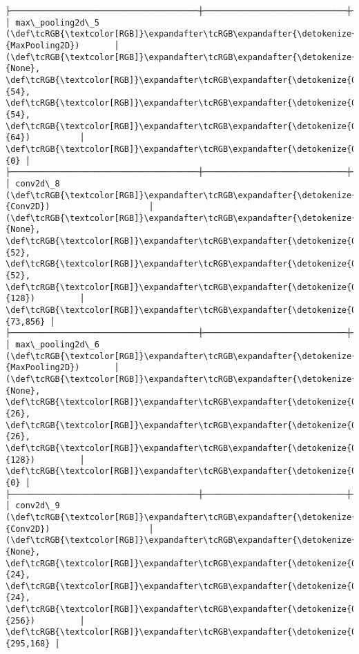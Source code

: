 \documentclass[11pt]{article}
\begin{document}
\begin{Verbatim}[commandchars=\\\{\}]
├──────────────────────────────────────┼─────────────────────────────┼─────────────────┤
│ max\_pooling2d\_5 (\def\tcRGB{\textcolor[RGB]}\expandafter\tcRGB\expandafter{\detokenize{0,135,255}}{MaxPooling2D})       │ (\def\tcRGB{\textcolor[RGB]}\expandafter\tcRGB\expandafter{\detokenize{0,215,255}}{None}, \def\tcRGB{\textcolor[RGB]}\expandafter\tcRGB\expandafter{\detokenize{0,175,0}}{54}, \def\tcRGB{\textcolor[RGB]}\expandafter\tcRGB\expandafter{\detokenize{0,175,0}}{54}, \def\tcRGB{\textcolor[RGB]}\expandafter\tcRGB\expandafter{\detokenize{0,175,0}}{64})          │               \def\tcRGB{\textcolor[RGB]}\expandafter\tcRGB\expandafter{\detokenize{0,175,0}}{0} │
├──────────────────────────────────────┼─────────────────────────────┼─────────────────┤
│ conv2d\_8 (\def\tcRGB{\textcolor[RGB]}\expandafter\tcRGB\expandafter{\detokenize{0,135,255}}{Conv2D})                    │ (\def\tcRGB{\textcolor[RGB]}\expandafter\tcRGB\expandafter{\detokenize{0,215,255}}{None}, \def\tcRGB{\textcolor[RGB]}\expandafter\tcRGB\expandafter{\detokenize{0,175,0}}{52}, \def\tcRGB{\textcolor[RGB]}\expandafter\tcRGB\expandafter{\detokenize{0,175,0}}{52}, \def\tcRGB{\textcolor[RGB]}\expandafter\tcRGB\expandafter{\detokenize{0,175,0}}{128})         │          \def\tcRGB{\textcolor[RGB]}\expandafter\tcRGB\expandafter{\detokenize{0,175,0}}{73,856} │
├──────────────────────────────────────┼─────────────────────────────┼─────────────────┤
│ max\_pooling2d\_6 (\def\tcRGB{\textcolor[RGB]}\expandafter\tcRGB\expandafter{\detokenize{0,135,255}}{MaxPooling2D})       │ (\def\tcRGB{\textcolor[RGB]}\expandafter\tcRGB\expandafter{\detokenize{0,215,255}}{None}, \def\tcRGB{\textcolor[RGB]}\expandafter\tcRGB\expandafter{\detokenize{0,175,0}}{26}, \def\tcRGB{\textcolor[RGB]}\expandafter\tcRGB\expandafter{\detokenize{0,175,0}}{26}, \def\tcRGB{\textcolor[RGB]}\expandafter\tcRGB\expandafter{\detokenize{0,175,0}}{128})         │               \def\tcRGB{\textcolor[RGB]}\expandafter\tcRGB\expandafter{\detokenize{0,175,0}}{0} │
├──────────────────────────────────────┼─────────────────────────────┼─────────────────┤
│ conv2d\_9 (\def\tcRGB{\textcolor[RGB]}\expandafter\tcRGB\expandafter{\detokenize{0,135,255}}{Conv2D})                    │ (\def\tcRGB{\textcolor[RGB]}\expandafter\tcRGB\expandafter{\detokenize{0,215,255}}{None}, \def\tcRGB{\textcolor[RGB]}\expandafter\tcRGB\expandafter{\detokenize{0,175,0}}{24}, \def\tcRGB{\textcolor[RGB]}\expandafter\tcRGB\expandafter{\detokenize{0,175,0}}{24}, \def\tcRGB{\textcolor[RGB]}\expandafter\tcRGB\expandafter{\detokenize{0,175,0}}{256})         │         \def\tcRGB{\textcolor[RGB]}\expandafter\tcRGB\expandafter{\detokenize{0,175,0}}{295,168} │

\end{Verbatim}
\end{document}
